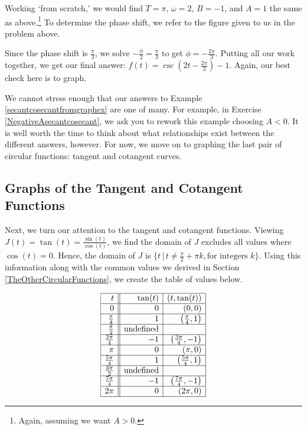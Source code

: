 \documentclass{ximera}
\begin{document}
\begin{example}
\begin{explanation}
\begin{enumerate}
Working `from scratch,' we would find $T = \pi$, $\omega = 2$, $B=-1$, and $A=1$ the same as above.\footnote{Again, assuming we want $A > 0$.}  To determine the phase shift, we refer to the figure given to us in the problem above.


Since the phase shift is $\frac{\pi}{3}$, we solve  $-\frac{\phi}{2} = \frac{\pi}{3}$ to get $\phi = -\frac{2\pi}{3}$. Putting all our work together, we get our final answer: $f(t) = \csc\left(2t - \frac{2\pi}{3} \right) - 1$.  Again, our best check here is to graph.

\end{enumerate}
\end{explanation}

\end{example}

We cannot stress enough that our answers to Example \ref{secantcosecantfromgraphex} are one of many.  For example, in Exercise \ref{NegativeAsecantcosecant}, we ask you to rework this example choosing $A<0$.  It is well worth the time to think about what relationships exist between the different answers, however.  For now, we move on to graphing the last pair of circular functions: tangent and cotangent curves.


\subsection{Graphs of the Tangent and Cotangent Functions}

Next, we turn our attention to the tangent and cotangent functions.  Viewing $J(t) = \tan(t) = \frac{\sin(t)}{\cos(t)}$, we find the domain of $J$ excludes all values where $\cos(t) = 0$.  Hence, the domain of $J$ is $\{ t \, | \, t \neq  \frac{\pi}{2} + \pi k, \text{for integers $k$} \}$.  Using this information along with the common values we derived in Section \ref{TheOtherCircularFunctions}, we create the table of values below.

\[ \begin{array}{|r||r|r|} \hline
t & \tan(t) & (t,\tan(t)) \\ \hline
0  & 0 & (0, 0) \\ \hline
\frac{\pi}{4}  & 1 & \left(\frac{\pi}{4},1 \right) \\ \hline 
\frac{\pi}{2}  & \text{undefined} &  \\ \hline 
\frac{3\pi}{4}  & -1 & \left(\frac{3\pi}{4}, -1\right) \\ \hline 
\pi & 0 & (\pi, 0) \\ \hline 
\frac{5\pi}{4}  & 1 & \left(\frac{5\pi}{4}, 1 \right) \\ \hline 
\frac{3\pi}{2}  & \text{undefined} &  \\ \hline 
\frac{7\pi}{4}  & -1 & \left(\frac{7\pi}{4}, -1 \right) \\ \hline 
2\pi  & 0 & (2\pi, 0) \\ \hline
\end{array} \] 
\end{document}
